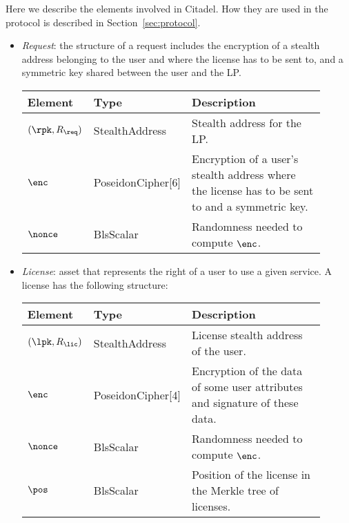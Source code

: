 

Here we describe the elements involved in Citadel. How they are used in the protocol is described in Section~\ref{sec:protocol}.

\begin{itemize}
	\itemsep1em 
	\item \emph{Request}: the structure of a request includes the encryption of a stealth address belonging to the user and where the license has to be sent to, and a symmetric key shared between the user and the LP.
	
	\vspace{0.1cm}
	\begin{center}
		\begin{tabular}{ | p{0.15\linewidth} | p{0.2\linewidth} | p{0.55\linewidth} | } 
		\hline
		{Element} & {Type} & {Description} \\
		\hline
		$(\rpk, R_{\req})$ & StealthAddress & Stealth address for the LP. \\
		$\enc$ & PoseidonCipher[6] & Encryption of a user's stealth address where the license has to be sent to and a symmetric key. \\
		$\nonce$ & BlsScalar & Randomness needed to compute $\enc$. \\ 
		\hline
		\end{tabular}
	\end{center}
	
	\item \emph{License}: asset that represents the right of a user to use a given service. A license has the following structure:
	
	\vspace{0.1cm}
    \begin{center}
		\begin{tabular}{ | p{0.15\linewidth} | p{0.2\linewidth} | p{0.55\linewidth} | } 
		\hline
			{Element} & {Type} & {Description} \\
		\hline
		$(\lpk, R_{\lic})$ & StealthAddress & License stealth address of the user. \\
		$\enc$ & PoseidonCipher[4] & Encryption of the data of some user attributes and signature of these data. \\
		$\nonce$ & BlsScalar & Randomness needed to compute $\enc$. \\ 
		$\pos$ & BlsScalar & Position of the license in the Merkle tree of licenses. \\ 
		\hline
		\end{tabular}
	\end{center}


\end{itemize}
